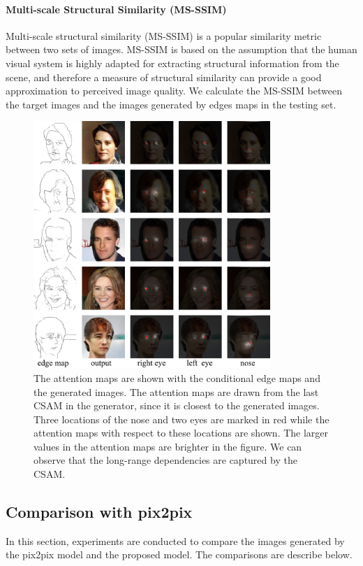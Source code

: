 \paragraph{Multi-scale Structural Similarity (MS-SSIM)} Multi-scale structural similarity (MS-SSIM) is a popular similarity metric between two sets of images. MS-SSIM is based on the assumption that the human visual system is highly adapted for extracting structural information from the scene, and therefore a measure of structural similarity can provide a good approximation to perceived image quality. We calculate the MS-SSIM between the target images and the images generated by edges maps in the testing set.
%
%
\begin{figure}
	\includegraphics[width=0.8\textwidth]{figures/attentionmap}
	\caption{The attention maps are shown with the conditional edge maps and the generated images. The attention maps are drawn from the last CSAM in the generator, since it is closest to the generated images. Three locations of the nose and two eyes are marked in red while the attention maps with respect to these locations are shown. The larger values in the attention maps are brighter in the figure. We can observe that the long-range dependencies are captured by the CSAM.}
	\label{fig:attention}
\end{figure}
%
%
\subsection{Comparison with pix2pix}
%
In this section, experiments are conducted to compare the images generated by the pix2pix model and the proposed model. The comparisons are describe below.

